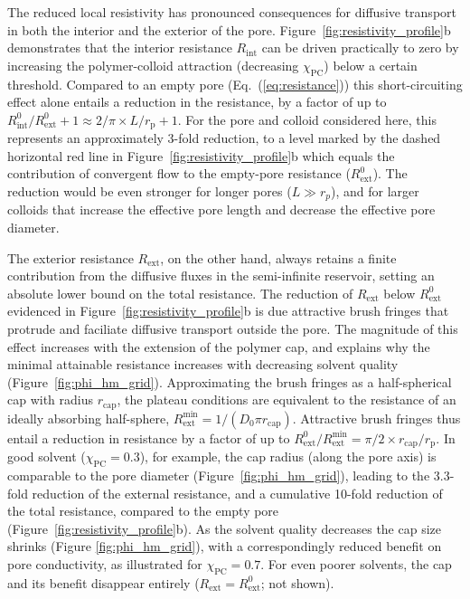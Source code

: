 \documentclass[12pt, a4paper]{article}
\begin{document}
The reduced local resistivity has pronounced consequences for diffusive transport in both the interior and the exterior of the pore.
Figure~\ref{fig:resistivity_profile}b demonstrates that the interior resistance $R_{\text{int}}$ can be driven practically to zero by increasing the polymer-colloid attraction (decreasing $\chi_\text{PC}$) below a certain threshold.
Compared to an empty pore (Eq.~(\ref{eq:resistance})) this short-circuiting effect alone entails a reduction in the resistance, by a factor of up to $R^0_{\text{int}}/R^0_{\text{ext}}+1 \approx 2/\pi \times L / r_{\text{p}} + 1$.
For the pore and colloid considered here, this represents an approximately 3-fold reduction, to a level marked by the dashed horizontal red line in Figure~\ref{fig:resistivity_profile}b which equals the contribution of convergent flow to the empty-pore resistance ($R^0_\text{ext}$).
The reduction would be even stronger for longer pores ($L\gg r_p$), and for larger colloids that increase the effective pore length and decrease the effective pore diameter.

The exterior resistance $R_{\text{ext}}$, on the other hand, always retains a finite contribution from the diffusive fluxes in the semi-infinite reservoir, setting an absolute lower bound on the total resistance.
The reduction of $R_{\text{ext}}$ below $R^0_\text{ext}$ evidenced in Figure~\ref{fig:resistivity_profile}b is due attractive brush fringes that protrude and faciliate diffusive transport outside the pore.
The magnitude of this effect increases with the extension of the polymer cap, and explains why the minimal attainable resistance increases with decreasing solvent quality (Figure~\ref{fig:phi_hm_grid}).
Approximating the brush fringes as a half-spherical cap with radius $r_\text{cap}$, the plateau conditions are equivalent to the resistance of an ideally absorbing half-sphere, $R_\text{ext}^\text{min} = 1 / (D_0 \pi r_\text{cap})$.
Attractive brush fringes thus entail a reduction in resistance by a factor of up to $R_\text{ext}^0 / R_\text{ext}^\text{min} = \pi/2 \times r_\text{cap}/r_\text{p}$.
In good solvent ($\chi_\text{PC} = 0.3$), for example, the cap radius (along the pore axis) is comparable to the pore diameter (Figure~\ref{fig:phi_hm_grid}), leading to the 3.3-fold reduction of the external resistance, and a cumulative 10-fold reduction of the total resistance, compared to the empty pore (Figure~\ref{fig:resistivity_profile}b).
As the solvent quality decreases the cap size shrinks (Figure \ref{fig:phi_hm_grid}), with a correspondingly reduced benefit on pore conductivity, as illustrated for $\chi_\text{PC} = 0.7$.
For even poorer solvents, the cap and its benefit disappear entirely ($R_\text{ext} = R_\text{ext}^0$; not shown).
\end{document}
